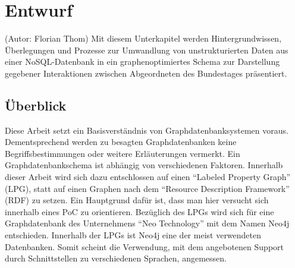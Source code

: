\section{Entwurf}
(Autor: Florian Thom)
\newline
\newline
Mit diesem Unterkapitel werden Hintergrundwissen, Überlegungen und Prozesse zur Umwandlung von unstrukturierten Daten aus einer NoSQL-Daten\-bank in ein graphenoptimiertes Schema zur Darstellung gegebener Interaktionen zwischen Abgeordneten des Bundestages präsentiert.
\subsection{Überblick}
Diese Arbeit setzt ein Basisverständnis von Graphdatenbanksystemen voraus. Dementsprechend werden zu besagten Graphdatenbanken keine Begriffsbestimmungen oder weitere Erläuterungen vermerkt.
\newline
Ein Graphdatenbankschema ist abhängig von verschiedenen Faktoren. Innerhalb dieser Arbeit wird sich dazu entschlossen auf einen \enquote{Labeled Property Graph} (LPG), statt auf einen Graphen nach dem \enquote{Resource Description Framework} (RDF) zu setzen. Ein Hauptgrund dafür ist, dass man hier versucht sich innerhalb eines PoC zu orientieren.
\newline
Bezüglich des LPGs wird sich für eine Graphdatenbank des Unternehmens \enquote{Neo Technology} mit dem Namen Neo4j entschieden. Innerhalb der LPGs ist Neo4j eine der meist verwendeten Datenbanken. Somit scheint die Verwendung, mit dem angebotenen Support durch Schnittstellen zu verschiedenen Sprachen, angemessen.
